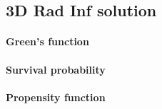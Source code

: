 \subsection{3D Rad Inf solution}

\paragraph{Green's function}

\paragraph{Survival probability}

\paragraph{Propensity function}
